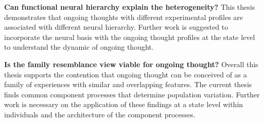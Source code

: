 \textbf{Can functional neural hierarchy explain the heterogeneity?} This thesis demonstrates that ongoing thoughts with different experimental profiles are associated with different neural hierarchy. Further work is suggested to incorporate the neural basis with the ongoing thought profiles at the state level to understand the dynamic of ongoing thought.

\textbf{Is the family resemblance view viable for ongoing thought?} Overall this thesis supports the contention that ongoing thought can be conceived of as a family of experiences with similar and overlapping features. The current thesis finds common component processes that determine population variation. Further work is necessary on the application of these findings at a state level within individuals and the architecture of the component processes.